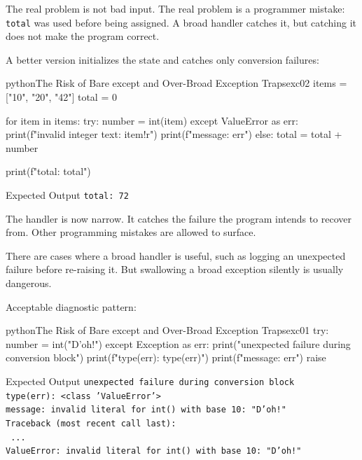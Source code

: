 The real problem is not bad input. The real problem is a programmer mistake: \texttt{total} was used before being assigned. A broad handler catches it, but catching it does not make the program correct.

A better version initializes the state and catches only conversion failures:

\begin{codebox}[]{python}{The Risk of Bare except and Over-Broad Exception Traps}{exc02}
items = ["10", "20", "42"]
total = 0

for item in items:
    try:
        number = int(item)
    except ValueError as err:
        print(f"invalid integer text: {item!r}")
        print(f"message: {err}")
    else:
        total = total + number

print(f"total: {total}")
\end{codebox}


\begin{iobox}{Expected Output}
\texttt{total: 72} \\
\end{iobox}


The handler is now narrow. It catches the failure the program intends to recover from. Other programming mistakes are allowed to surface.

There are cases where a broad handler is useful, such as logging an unexpected failure before re-raising it. But swallowing a broad exception silently is usually dangerous.

Acceptable diagnostic pattern:

\begin{codebox}[]{python}{The Risk of Bare except and Over-Broad Exception Traps}{exc01}
try:
    number = int("D'oh!")
except Exception as err:
    print("unexpected failure during conversion block")
    print(f"type(err): {type(err)}")
    print(f"message: {err}")
    raise
\end{codebox}


\begin{iobox}{Expected Output}
\texttt{unexpected failure during conversion block} \\
\texttt{type(err): <class 'ValueError'>} \\
\texttt{message: invalid literal for int() with base 10: "D'oh!"} \\
\texttt{Traceback (most recent call last):} \\
\texttt{  ...} \\
\texttt{ValueError: invalid literal for int() with base 10: "D'oh!"} \\
\end{iobox}


